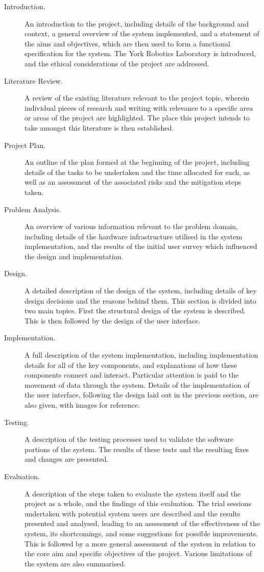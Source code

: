 \begin{description}
 \item [Introduction.] An introduction to the project, including details of the background and context, a general overview of the system implemented, and a statement of the aims and objectives, which are then used to form a functional specification for the system. The York Robotics Laboratory is introduced, and the ethical considerations of the project are addressed.
 \item [Literature Review.] A review of the existing literature relevant to the project topic, wherein individual pieces of research and writing with relevance to a specific area or areas of the project are highlighted. The place this project intends to take amongst this literature is then established.
 \item [Project Plan.] An outline of the plan formed at the beginning of the project, including details of the tasks to be undertaken and the time allocated for each, as well as an assessment of the associated risks and the mitigation steps taken.
 \item [Problem Analysis.] An overview of various information relevant to the problem domain, including details of the hardware infrastructure utilised in the system implementation, and the results of the initial user survey which influenced the design and implementation.
 \item [Design.] A detailed description of the design of the system, including details of key design decisions and the reasons behind them. This section is divided into two main topics. First the structural design of the system is described. This is then followed by the design of the user interface.
 \item [Implementation.] A full description of the system implementation, including implementation details for all of the key components, and explanations of how these components connect and interact. Particular attention is paid to the movement of data through the system. Details of the implementation of the user interface, following the design laid out in the previous section, are also given, with images for reference.
 \item [Testing.] A description of the testing processes used to validate the software portions of the system. The results of these tests and the resulting fixes and changes are presented.
 \item [Evaluation.] A description of the steps taken to evaluate the system itself and the project as a whole, and the findings of this evaluation. The trial sessions undertaken with potential system users are described and the results presented and analysed, leading to an assessment of the effectiveness of the system, its shortcomings, and some suggestions for possible improvements. This is followed by a more general assessment of the system in relation to the core aim and specific objectives of the project. Various limitations of the system are also summarised.

\end{description}

